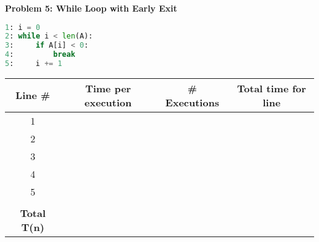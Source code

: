 \documentclass[11pt]{article}
\newenvironment{problem}{\vspace{1em}\noindent}{\vspace{2em}}
\begin{document}
\begin{problem}
\textbf{Problem 5: While Loop with Early Exit}

\begin{lstlisting}[language=Python]
1: i = 0
2: while i < len(A):
3:     if A[i] < 0:
4:         break
5:     i += 1
\end{lstlisting}

\begin{tabular}{|c|c|c|c|}
\hline
Line \# & Time per execution & \# Executions & Total time for line \\
\hline
1 & & & \\
2 & & & \\
3 & & & \\
4 & & & \\
5 & & & \\
\hline
 & & & \\
\textbf{Total T(n)} & & & \\
\hline
\end{tabular}
\end{problem}
\end{document}
